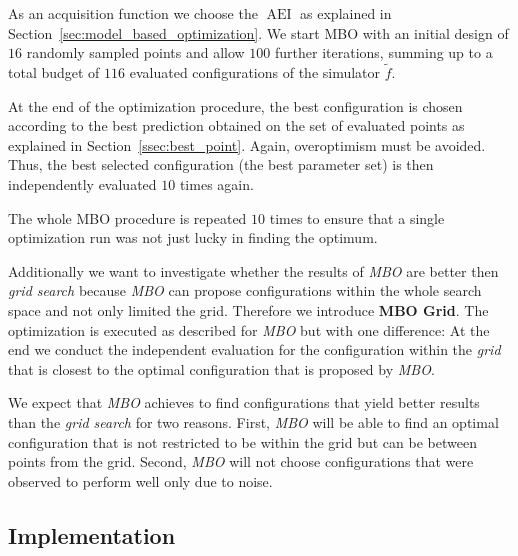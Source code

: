 \documentclass[bimj,fleqn]{w-art}
\theoremstyle{plain}
\theoremstyle{definition}
\begin{document}
As an acquisition function we choose the $\operatorname{AEI}$ as explained in Section~\ref{sec:model_based_optimization}.
We start MBO with an initial design of $16$ randomly sampled points and allow $100$ further iterations, summing up to a total budget of $116$ evaluated configurations of the simulator $\tilde{f}$.

At the end of the optimization procedure, the best configuration is chosen according to the best prediction obtained on the set of evaluated points as explained in Section~\ref{ssec:best_point}.
Again, overoptimism must be avoided. 
Thus, the best selected configuration (the best parameter set) is then independently evaluated $10$ times again.

The whole MBO procedure is repeated $10$ times to ensure that a single optimization run was not just lucky in finding the optimum.

Additionally we want to investigate whether the results of \emph{MBO} are better then \emph{grid search} because \emph{MBO} can propose configurations within the whole search space and not only limited the grid.
Therefore we introduce \textbf{MBO Grid}.
The optimization is executed as described for \emph{MBO} but with one difference:
At the end we conduct the independent evaluation for the configuration within the \emph{grid} that is closest to the optimal configuration that is proposed by \emph{MBO}.

We expect that \emph{MBO} achieves to find configurations that yield better results than the \emph{grid search} for two reasons.
First, \emph{MBO} will be able to find an optimal configuration that is not restricted to be within the grid but can be between points from the grid.
Second, \emph{MBO} will not choose configurations that were observed to perform well only due to noise.

\subsection{Implementation}
\end{document}
